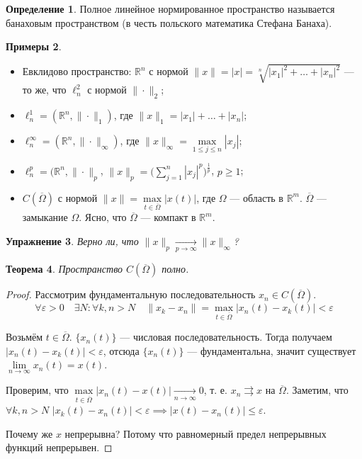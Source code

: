\documentclass[11pt,openany,a4paper]{scrartcl}
\theoremstyle{plain}
\newtheorem{theorem}{Теорема}[subsection]
\newtheorem{exercise}[theorem]{Упражнение}
\theoremstyle{definition}
\newtheorem{definition}[theorem]{Определение}
\newtheorem{examples}[theorem]{Примеры}
\newcommand\mb{\mathbb}
\newcommand\real{\mb R}
\newcommand{\uto}{\rightrightarrows}
\newcommand{\underto}[1]{\xrightarrow[#1]{}}
\begin{document}
\begin{definition}
    Полное линейное нормированное пространство называется банаховым пространством (в честь
    польского математика Стефана Банаха).
\end{definition}
\begin{examples}
\mbox{}
    \begin{itemize}
        \item Евклидово пространство: $\real^n$ с нормой
        $\|x\| = |x| = \sqrt[n]{|x_1|^2 + \ldots + |x_n|^2}$ — то же, что
        $\ell_n^2$ с нормой $\|\cdot \|_2$;
        \item $\ell_n^1 = (\real^n, \|\cdot\|_1)$, где
        $\|x\|_1 = |x_1| + \ldots + |x_n|$;
        \item $\ell_n^\infty = (\real^n, \|\cdot\|_\infty)$,
        где $\|x\|_\infty = \max\limits_{1 \leqslant j \leqslant n} |x_j|$;
        \item $\ell_n^p = (\real^n, \|\cdot\|_p$,
        $\|x\|_p = \bigg(\sum\limits_{j=1}^n |x_j|^p\bigg)^{\frac{1}{p}}$,
        $p \geqslant 1$;
        \item $C(\overline \Omega)$ с нормой
        $\|x\| = \max\limits_{t \in \overline \Omega} |x(t)|$, где
        $\Omega$ — область в $\real^m$. $\overline\Omega$ — замыкание
        $\Omega$. Ясно, что $\overline \Omega$ — компакт в
        $\real^m$.
    \end{itemize}
\end{examples}
\begin{exercise}
    Верно ли, что $\|x\|_p \underto{p \to \infty} \|x\|_\infty$?
\end{exercise}

\begin{theorem}
    Пространство $C(\overline \Omega)$ полно.
\end{theorem}
\begin{proof}
    Рассмотрим фундаментальную последовательность $x_n \in C(\overline \Omega)$.
    $$
    \forall \varepsilon > 0\quad \exists N: \forall k, n > N\quad \|x_k - x_n\| =
    \max_{t \in \overline \Omega} |x_n(t) - x_k(t)| < \varepsilon
    $$

    Возьмём $t \in \overline \Omega$. $\{x_n(t)\}$ — числовая последовательность.
    Тогда получаем $|x_n(t) - x_k(t)| < \varepsilon$, отсюда $\{x_n(t)\}$ —
    фундаментальна, значит существует $\lim\limits_{n \to \infty} x_n(t) = x(t)$.

    Проверим, что $\max\limits_{t \in \overline \Omega} |x_n(t) - x(t)|
    \underto{n \to \infty} 0$, т. е. $x_n \uto x$ на $\overline \Omega$.
    Заметим, что $\forall k, n > N$ $|x_k(t) - x_n(t)| < \varepsilon \implies
    |x(t) - x_n(t)| \leqslant \varepsilon$.

    Почему же $x$ непрерывна? Потому что равномерный предел непрерывных функций
    непрерывен.

\end{proof}
\end{document}
